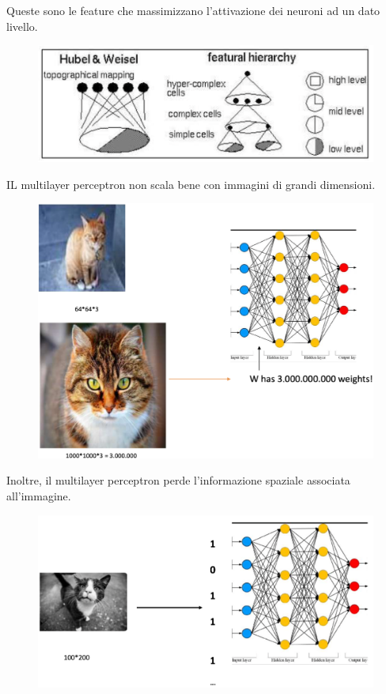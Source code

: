 Queste sono le feature che massimizzano l'attivazione dei neuroni ad un dato livello.
\begin{figure}[!h]
    \includegraphics[scale=.5]{images/cnn/features_hierarchy02.png}
    \centering
\end{figure}
\newpage
IL multilayer perceptron non scala bene con immagini di grandi dimensioni.
\begin{figure}[!h]
    \includegraphics[scale=.5]{images/cnn/features_hierarchy03.png}
    \centering
\end{figure}



Inoltre, il multilayer perceptron perde l'informazione spaziale associata all'immagine.
\begin{figure}[!h]
    \includegraphics[scale=.5]{images/cnn/features_hierarchy04.png}
    \centering
\end{figure}
\newpage
